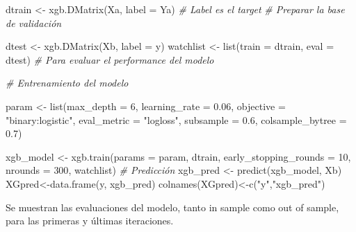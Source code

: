 \documentclass[
]{book}
\newenvironment{Shaded}{\begin{snugshade}}{\end{snugshade}}
\newcommand{\AttributeTok}[1]{\textcolor[rgb]{0.77,0.63,0.00}{#1}}
\newcommand{\CommentTok}[1]{\textcolor[rgb]{0.56,0.35,0.01}{\textit{#1}}}
\newcommand{\DecValTok}[1]{\textcolor[rgb]{0.00,0.00,0.81}{#1}}
\newcommand{\FloatTok}[1]{\textcolor[rgb]{0.00,0.00,0.81}{#1}}
\newcommand{\FunctionTok}[1]{\textcolor[rgb]{0.00,0.00,0.00}{#1}}
\newcommand{\NormalTok}[1]{#1}
\newcommand{\OtherTok}[1]{\textcolor[rgb]{0.56,0.35,0.01}{#1}}
\newcommand{\SpecialCharTok}[1]{\textcolor[rgb]{0.00,0.00,0.00}{#1}}
\newcommand{\StringTok}[1]{\textcolor[rgb]{0.31,0.60,0.02}{#1}}
\begin{document}
\begin{Shaded}
\begin{Highlighting}[]
\NormalTok{dtrain }\OtherTok{\textless{}{-}} \FunctionTok{xgb.DMatrix}\NormalTok{(Xa, }\AttributeTok{label =}\NormalTok{ Ya) }
\CommentTok{\# Label es el target}
\CommentTok{\# Preparar la base de validación}

\NormalTok{dtest }\OtherTok{\textless{}{-}} \FunctionTok{xgb.DMatrix}\NormalTok{(Xb, }\AttributeTok{label =}\NormalTok{ y)}
\NormalTok{watchlist }\OtherTok{\textless{}{-}} \FunctionTok{list}\NormalTok{(}\AttributeTok{train =}\NormalTok{ dtrain, }\AttributeTok{eval =}\NormalTok{ dtest) }
\CommentTok{\# Para evaluar el performance del modelo}


\CommentTok{\# Entrenamiento del modelo}

\NormalTok{param }\OtherTok{\textless{}{-}} \FunctionTok{list}\NormalTok{(}\AttributeTok{max\_depth =} \DecValTok{6}\NormalTok{, }\AttributeTok{learning\_rate =} \FloatTok{0.06}\NormalTok{, }
              \AttributeTok{objective =} \StringTok{"binary:logistic"}\NormalTok{,}
              \AttributeTok{eval\_metric =} \StringTok{"logloss"}\NormalTok{, }\AttributeTok{subsample =} \FloatTok{0.6}\NormalTok{, }\AttributeTok{colsample\_bytree =} \FloatTok{0.7}\NormalTok{)}


\NormalTok{xgb\_model }\OtherTok{\textless{}{-}} \FunctionTok{xgb.train}\NormalTok{(}\AttributeTok{params =}\NormalTok{ param, dtrain, }
                       \AttributeTok{early\_stopping\_rounds =}  \DecValTok{10}\NormalTok{, }
                       \AttributeTok{nrounds =} \DecValTok{300}\NormalTok{,}
\NormalTok{                 watchlist)}
\CommentTok{\# Predicción}
\NormalTok{xgb\_pred }\OtherTok{\textless{}{-}} \FunctionTok{predict}\NormalTok{(xgb\_model, Xb)}
\NormalTok{XGpred}\OtherTok{\textless{}{-}}\FunctionTok{data.frame}\NormalTok{(y, xgb\_pred)}
\FunctionTok{colnames}\NormalTok{(XGpred)}\OtherTok{\textless{}{-}}\FunctionTok{c}\NormalTok{(}\StringTok{"y"}\NormalTok{,}\StringTok{"xgb\_pred"}\NormalTok{)}
\end{Highlighting}
\end{Shaded}

Se muestran las evaluaciones del modelo, tanto in sample como out of sample, para las primeras y últimas iteraciones.

\begin{Shaded}
\end{Shaded}
\end{document}
